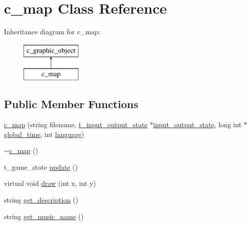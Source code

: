 \hypertarget{classc__map}{\section{c\-\_\-map Class Reference}
\label{classc__map}
}
Inheritance diagram for c\-\_\-map\-:\begin{figure}[H]
\begin{center}
\leavevmode
\includegraphics[height=2.000000cm]{classc__map}
\end{center}
\end{figure}
\subsection*{Public Member Functions}
\begin{DoxyCompactItemize}
\item 
\hyperlink{classc__map_a93f9dfae5ef4afdb1b37ee4d31dab1ce}{c\-\_\-map} (string filename, \hyperlink{structt__input__output__state}{t\-\_\-input\-\_\-output\-\_\-state} $\ast$\hyperlink{classc__map_a548cfcecd3a9981dc3c4dd950ceaeab4}{input\-\_\-output\-\_\-state}, long int $\ast$\hyperlink{classc__graphic__object_a9ff91aa7a60272a8f713ff011a0cc0bb}{global\-\_\-time}, int \hyperlink{classc__map_af60c23046dcafb3b9c4a3e097f9e586e}{language})
\item 
\hyperlink{classc__map_a44b7baccc0fafd64c0ff922d127dfb7a}{$\sim$c\-\_\-map} ()
\item 
t\-\_\-game\-\_\-state \hyperlink{classc__map_afcdeaf89863b1c4c758dbb32d2020a25}{update} ()
\item 
virtual void \hyperlink{classc__map_a46afcfac9b83f37a28a5cf3e1da91ef6}{draw} (int x, int y)
\item 
string \hyperlink{classc__map_add3edd9d671e1e62e66baaed5e98a9e9}{get\-\_\-description} ()
\item 
string \hyperlink{classc__map_a2e4546cf04d6149b7d55664f62779f71}{get\-\_\-music\-\_\-name} ()
\end{DoxyCompactItemize}
